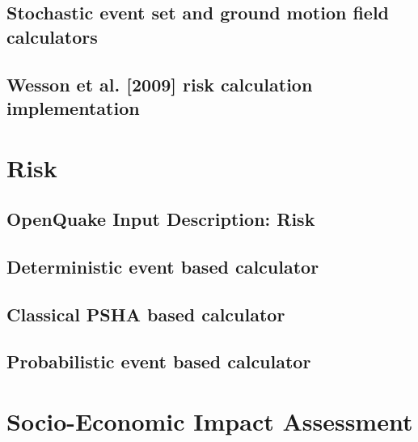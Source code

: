\documentclass[12pt,a4paper,headings=small,version=first,dvips]{scrbook}
\begin{document}
\chapter{Stochastic event set and ground motion field calculators}
	
\chapter{Wesson et al. [2009] risk calculation implementation}
	
\part{Risk}
\chapter{OpenQuake Input Description: Risk}
	
\chapter{Deterministic event based calculator}
	
\chapter{Classical PSHA based calculator}
	
\chapter{Probabilistic event based calculator}
	
\part{Socio-Economic Impact Assessment}
	
\end{document}

